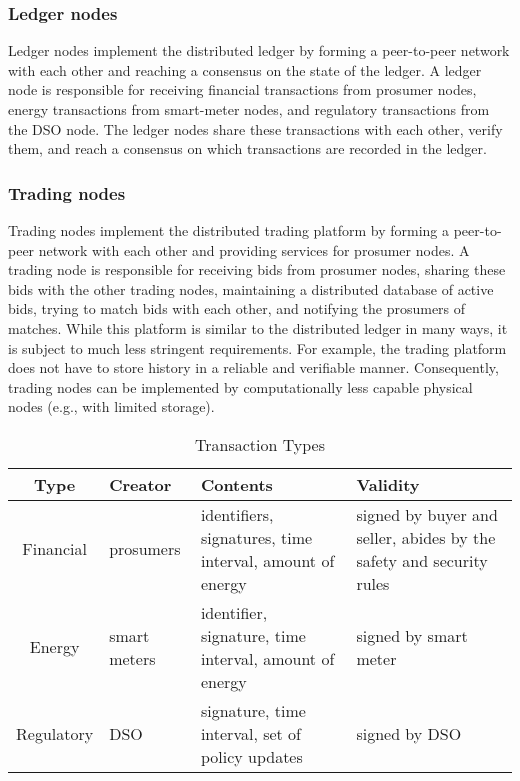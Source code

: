\documentclass[chi_draft]{sigchi}
\begin{document}
\subsubsection{Ledger nodes}
Ledger nodes implement the distributed ledger by forming a peer-to-peer network with each other and reaching a consensus on the state of the ledger.
A ledger node is responsible for receiving financial transactions from prosumer nodes, energy transactions from smart-meter nodes, and regulatory transactions from the DSO node.
The ledger nodes share these transactions with each other, verify them, and reach a consensus on which transactions are recorded in the ledger. 

\subsubsection{Trading nodes}
Trading nodes implement the distributed trading platform by forming a peer-to-peer network with each other and providing services for prosumer nodes.
A trading node is responsible for receiving bids from prosumer nodes, sharing these bids with the other trading nodes, maintaining a distributed database of active bids, trying to match bids with each other, and notifying the prosumers of matches.
While this platform is similar to the distributed ledger in many ways, it is subject to much less stringent requirements.
For example, the trading platform does not have to store history in a reliable and verifiable manner.
Consequently, trading nodes can be implemented by computationally less capable physical nodes (e.g., with limited storage).

\begin{table*}
\caption{Transaction Types}
\label{tab:transactionTypes}
\begin{tabular}{|c||l|l|p{5.8cm}|}
\hline
\textbf{Type} & \textbf{Creator} & \textbf{Contents} & \textbf{Validity} \\
\hline\hline
\rowcolor{Gray} Financial  & prosumers    & identifiers, signatures, time interval, amount of energy & signed by buyer and seller, abides by the safety and security rules \\ \hline
                Energy     & smart meters & identifier, signature, time interval, amount of energy   & signed by smart meter \\ \hline
\rowcolor{Gray} Regulatory & DSO          & signature, time interval, set of policy updates            & signed by DSO \\ \hline
\end{tabular}
\end{table*}
\end{document}
